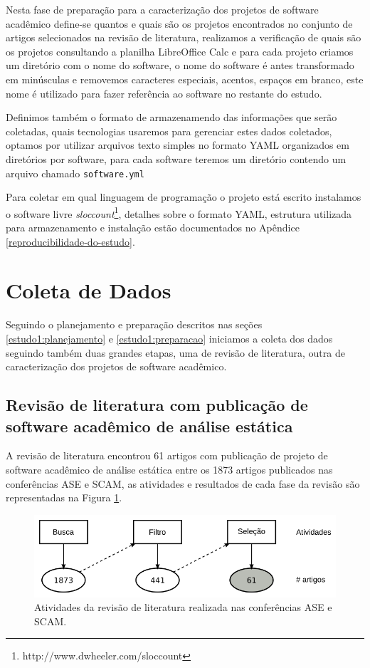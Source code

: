 Nesta fase de preparação para a caracterização dos projetos de software
acadêmico define-se quantos e quais são os projetos encontrados no conjunto de
artigos selecionados na revisão de literatura, realizamos a verificação de
quais são os projetos consultando a planilha LibreOffice Calc e para cada
projeto criamos um diretório com o nome do software, o nome do software é antes
transformado em minúsculas e removemos caracteres especiais, acentos, espaços
em branco, este nome é utilizado para fazer referência ao software no restante
do estudo.

Definimos também o formato de armazenamendo das informações que serão
coletadas, quais tecnologias usaremos para gerenciar estes dados coletados,
optamos por utilizar arquivos texto simples no formato YAML organizados em
diretórios por software, para cada software teremos um diretório contendo um
arquivo chamado \texttt{software.yml}

Para coletar em qual linguagem de programação o projeto está escrito instalamos
o software livre {\it sloccount}\footnote{http://www.dwheeler.com/sloccount},
detalhes sobre o formato YAML, estrutura utilizada para armazenamento e
instalação estão documentados no Apêndice \ref{reproducibilidade-do-estudo}.


\section{Coleta de Dados} \label{estudo1:coleta} %

Seguindo o planejamento e preparação descritos nas seções
\ref{estudo1:planejamento} e \ref{estudo1:preparacao} iniciamos a coleta dos
dados seguindo também duas grandes etapas, uma de revisão de literatura, outra
de caracterização dos projetos de software acadêmico.

\subsection{Revisão de literatura com publicação de software acadêmico de análise estática}

A revisão de literatura encontrou 61 artigos com publicação de projeto de
software acadêmico de análise estática entre os 1873 artigos publicados nas
conferências ASE e SCAM, as atividades e resultados de cada fase da revisão são
representadas na Figura \ref{revisao-literatura-execucao}.

\begin{figure}[h]
  \center
  \includegraphics[scale=0.4]{imagens/revisao-literatura-execucao.png}
  \caption{Atividades da revisão de literatura realizada nas conferências ASE e SCAM.}
  \label{revisao-literatura-execucao}
\end{figure}


